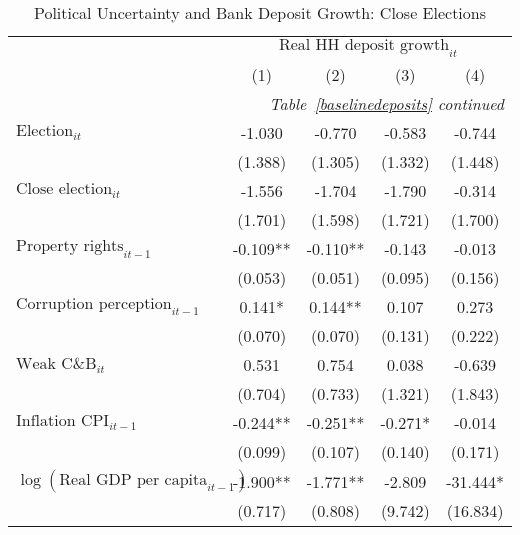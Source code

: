 \begin{longtable}{m{8cm}*{4}{c}}                                         \caption{Political Uncertainty and Bank Deposit Growth: Close Elections \label{cedeposits}}\\                                         \toprule                                         &\multicolumn{4}{c}{$\text{Real HH deposit growth}_{it}$} \\ \cmidrule(lr){2-5}
                    &         (1)   &         (2)   &         (3)   &         (4)   \\
\midrule\endfirsthead                                         \multicolumn{5}{r}{\textit{Table~\ref{baselinedeposits} continued}} \\                                         \toprule\endhead\midrule\endfoot\endlastfoot
$\text{Election}_{it}$&      -1.030   &      -0.770   &      -0.583   &      -0.744   \\
                    &     (1.388)   &     (1.305)   &     (1.332)   &     (1.448)   \\
$\text{Close election}_{it}$&      -1.556   &      -1.704   &      -1.790   &      -0.314   \\
                    &     (1.701)   &     (1.598)   &     (1.721)   &     (1.700)   \\
$\text{Property rights}_{it-1}$&      -0.109** &      -0.110** &      -0.143   &      -0.013   \\
                    &     (0.053)   &     (0.051)   &     (0.095)   &     (0.156)   \\
$\text{Corruption perception}_{it-1}$&       0.141*  &       0.144** &       0.107   &       0.273   \\
                    &     (0.070)   &     (0.070)   &     (0.131)   &     (0.222)   \\
$\text{Weak C\&B}_{it}$&       0.531   &       0.754   &       0.038   &      -0.639   \\
                    &     (0.704)   &     (0.733)   &     (1.321)   &     (1.843)   \\
$\text{Inflation CPI}_{it-1}$&      -0.244** &      -0.251** &      -0.271*  &      -0.014   \\
                    &     (0.099)   &     (0.107)   &     (0.140)   &     (0.171)   \\
$\log(\text{Real GDP per capita}_{it-1})$&      -1.900** &      -1.771** &      -2.809   &     -31.444*  \\
                    &     (0.717)   &     (0.808)   &     (9.742)   &    (16.834)   \\

\end{longtable}
